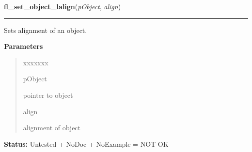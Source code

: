 \hspace{.8\funcindent}\begin{boxedminipage}{\funcwidth}

    \raggedright \textbf{fl\_set\_object\_lalign}(\textit{pObject}, \textit{align})

    \vspace{-1.5ex}

    \rule{\textwidth}{0.5\fboxrule}
\setlength{\parskip}{2ex}
    Sets alignment of an object.

\setlength{\parskip}{1ex}
      \textbf{Parameters}
      \vspace{-1ex}

      \begin{quote}
        \begin{Ventry}{xxxxxxx}

          \item[pObject]

          pointer to object

          \item[align]

          alignment of object

        \end{Ventry}

      \end{quote}

\textbf{Status:} Untested + NoDoc + NoExample = NOT OK



    \end{boxedminipage}

    \label{xformslib:library:fl_get_object_lalign}

    \vspace{0.5ex}

